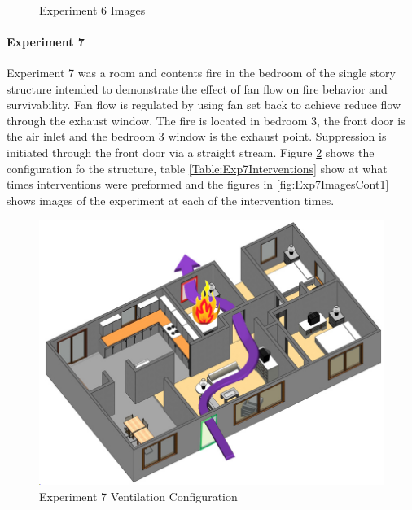 \documentclass{article}
\begin{document}
\begin{figure}[H]
	\ContinuedFloat 
	\centering 
	 \ 
	\caption{Experiment 6 Images}
	\label{fig:Experiment6ImagesCont4} 
\end{figure}

\paragraph{Experiment 7}\mbox{}

Experiment 7 was a room and contents fire in the bedroom of the single story structure intended to demonstrate the effect of fan flow on fire behavior and survivability. Fan flow is regulated by using fan set back to achieve reduce flow through the exhaust window. The fire is located in bedroom 3, the front door is the air inlet and the bedroom 3 window is the exhaust point. Suppression is initiated through the front door via a straight stream. Figure \ref{fig:Exp7VentConfig} shows the configuration fo the structure, table \ref{Table:Exp7Interventions} show at what times interventions were preformed and the figures in \ref{fig:Exp7ImagesCont1} shows images of the experiment at each of the intervention times.

\begin{figure}[h!]
	\centering
	\includegraphics[width=5in]{0_Images/FireExperiments/Single_Story/Experiment_7.jpg}
	\caption{Experiment 7 Ventilation Configuration}
	\label{fig:Exp7VentConfig}
\end{figure}
\end{document}
